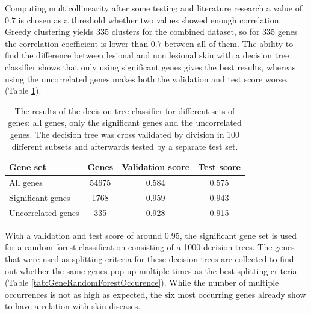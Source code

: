 \documentclass[10pt,a4paper]{article}
\begin{document}
	
	Computing multicollinearity after some testing and literature research a value of $0.7$ is chosen as a threshold whether two values showed enough correlation. Greedy clustering yields 335 clusters for the combined dataset, so for 335 genes the correlation coefficient is lower than $0.7$ between all of them. The ability to find the difference between lesional and non lesional skin with a decision tree classifier shows that only using significant genes gives the best results, whereas using the uncorrelated genes makes both the validation and test score worse. (Table \ref{tab:DecisionTreeResults}).
	
	\begin{table}[H]
		\centering
		\caption{The results of the decision tree classifier for different sets of genes: all genes, only the significant genes and the uncorrelated genes. The decision tree was cross validated by division in 100 different subsets and afterwards tested by a separate test set.}
		\label{tab:DecisionTreeResults}
		\begin{tabular}{l|ccc}
			\textbf{Gene set}                                            & \textbf{Genes} & \textbf{Validation score} & \textbf{Test score} \\ \hline
			All genes                                                    & 54675             & 0.584                     & 0.575               \\
			Significant genes                                            & 1768              & 0.959                     & 0.943               \\
			Uncorrelated genes & 335               & 0.928                     & 0.915              
		\end{tabular}
	\end{table}
	
	With a validation and test score of around 0.95, the significant gene set is used for a random forest classification consisting of a 1000 decision trees. The genes that were used as splitting criteria for these decision trees are collected to find out whether the same genes pop up multiple times as the best splitting criteria (Table \ref{tab:GeneRandomForestOccurence}). While the number of multiple occurrences is not as high as expected, the six most occurring genes already show to have a relation with skin diseases. 
	
\end{document}
